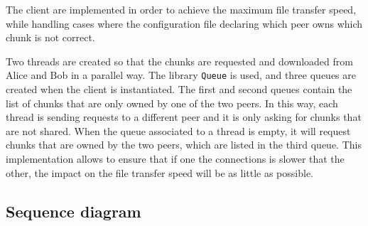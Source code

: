 The client are implemented in order to achieve the maximum file transfer speed, while handling cases where the configuration file declaring which peer owns which chunk is not correct.

Two threads are created so that the chunks are requested and downloaded from Alice and Bob in a parallel way. The library \texttt{Queue} is used, and three queues are created when the client is instantiated. The first and second queues contain the list of chunks that are only owned by one of the two peers. In this way, each thread is sending requests to a different peer and it is only asking for chunks that are not shared. When the queue associated to a thread is empty, it will request chunks that are owned by the two peers, which are listed in the third queue. This implementation allows to ensure that if one the connections is slower that the other, the impact on the file transfer speed will be as little as possible.


\subsection{Sequence diagram}